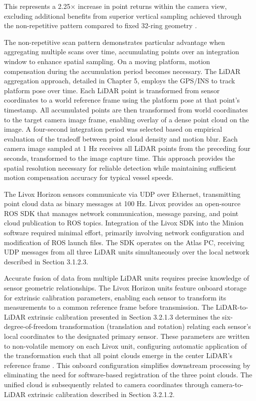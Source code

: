 \documentclass{erauthesis}
\begin{document}
This represents a 2.25× increase in point returns within the camera view, excluding additional benefits from superior vertical sampling achieved through the non-repetitive pattern compared to fixed 32-ring geometry \cite{thompson2023}.

The non-repetitive scan pattern demonstrates particular advantage when aggregating multiple scans over time, accumulating points over an integration window to enhance spatial sampling.
On a moving platform, motion compensation during the accumulation period becomes necessary.
The \ac{LiDAR} aggregation approach, detailed in Chapter 5, employs the \ac{GPS}/\ac{INS} to track platform pose over time.
Each \ac{LiDAR} point is transformed from sensor coordinates to a world reference frame using the platform pose at that point's timestamp.
All accumulated points are then transformed from world coordinates to the target camera image frame, enabling overlay of a dense point cloud on the image.
A four-second integration period was selected based on empirical evaluation of the tradeoff between point cloud density and motion blur.
Each camera image sampled at 1 Hz receives all \ac{LiDAR} points from the preceding four seconds, transformed to the image capture time.
This approach provides the spatial resolution necessary for reliable detection while maintaining sufficient motion compensation accuracy for typical vessel speeds.

The Livox Horizon sensors communicate via UDP over Ethernet, transmitting point cloud data as binary messages at 100 Hz.
Livox provides an open-source \ac{ROS} SDK that manages network communication, message parsing, and point cloud publication to \ac{ROS} topics.
Integration of the Livox SDK into the Minion software required minimal effort, primarily involving network configuration and modification of \ac{ROS} launch files.
The SDK operates on the Atlas PC, receiving UDP messages from all three \ac{LiDAR} units simultaneously over the local network described in Section 3.1.2.3.

Accurate fusion of data from multiple \ac{LiDAR} units requires precise knowledge of sensor geometric relationships.
The Livox Horizon units feature onboard storage for extrinsic calibration parameters, enabling each sensor to transform its measurements to a common reference frame before transmission.
The \ac{LiDAR}-to-\ac{LiDAR} extrinsic calibration presented in Section 3.2.1.3 determines the six-degree-of-freedom transformation (translation and rotation) relating each sensor's local coordinates to the designated primary sensor.
These parameters are written to non-volatile memory on each Livox unit, configuring automatic application of the transformation such that all point clouds emerge in the center \ac{LiDAR}'s reference frame \cite{thompson2023}.
This onboard configuration simplifies downstream processing by eliminating the need for software-based registration of the three point clouds.
The unified cloud is subsequently related to camera coordinates through camera-to-\ac{LiDAR} extrinsic calibration described in Section 3.2.1.2.
\end{document}
